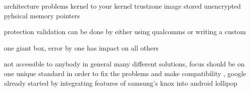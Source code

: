architecture problems
kernel to your kernel
trustzone image stored unencrypted
pyhsical memory pointers

protection
validation can be done by either using qualcomms or writing a custom

one giant box, error by one has impact on all others

\cite{dragonTZ}\cite{armTz}
%

not accessible to anybody
in general many different solutions, focus should be on one unique standard in order to fix the problems and make compatibility , google already started by integrating features of samsung's knox into android lollipop \cite{samsungKnox}

